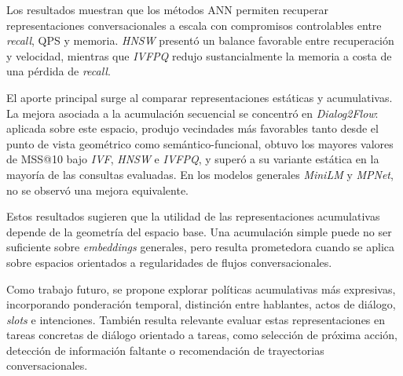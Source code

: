 \documentclass[runningheads]{llncs}
\begin{document}
Los resultados muestran que los métodos ANN permiten recuperar representaciones conversacionales a escala con compromisos controlables entre \textit{recall}, QPS y memoria. \textit{HNSW} presentó un balance favorable entre recuperación y velocidad, mientras que \textit{IVFPQ} redujo sustancialmente la memoria a costa de una pérdida de \textit{recall}.

El aporte principal surge al comparar representaciones estáticas y acumulativas. La mejora asociada a la acumulación secuencial se concentró en \textit{Dialog2Flow}: aplicada sobre este espacio, produjo vecindades más favorables tanto desde el punto de vista geométrico como semántico-funcional, obtuvo los mayores valores de MSS@10 bajo \textit{IVF}, \textit{HNSW} e \textit{IVFPQ}, y superó a su variante estática en la mayoría de las consultas evaluadas. En los modelos generales \textit{MiniLM} y \textit{MPNet}, no se observó una mejora equivalente.

Estos resultados sugieren que la utilidad de las representaciones acumulativas depende de la geometría del espacio base. Una acumulación simple puede no ser suficiente sobre \textit{embeddings} generales, pero resulta prometedora cuando se aplica sobre espacios orientados a regularidades de flujos conversacionales.

Como trabajo futuro, se propone explorar políticas acumulativas más expresivas, incorporando ponderación temporal, distinción entre hablantes, actos de diálogo, \textit{slots} e intenciones. También resulta relevante evaluar estas representaciones en tareas concretas de diálogo orientado a tareas, como selección de próxima acción, detección de información faltante o recomendación de trayectorias conversacionales.



\end{document}
